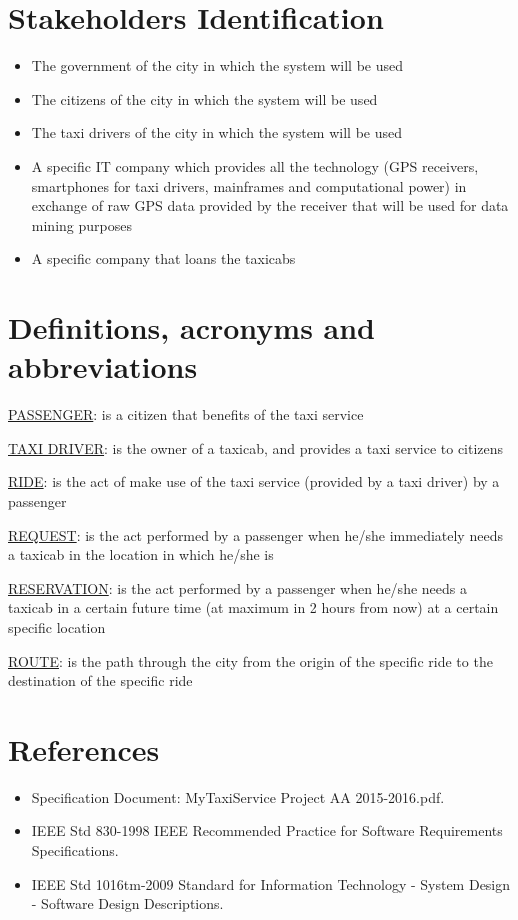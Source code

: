 \section{Stakeholders Identification}
\begin{itemize}
	\item The government of the city in which the system will be used
	\item The citizens of the city in which the system will be used
	\item The taxi drivers of the city in which the system will be used
	\item A specific IT company which provides all the technology (GPS receivers, smartphones for taxi drivers, mainframes and computational power) in exchange of raw GPS data provided by the receiver that will be used for data mining purposes
	\item A specific company that loans the taxicabs
\end{itemize}

\section{Definitions, acronyms and abbreviations}
\begin{description}
	\item \underline{PASSENGER}: is a citizen that benefits of the taxi service
	\item \underline{TAXI DRIVER}: is the owner of a taxicab, and provides a taxi service to citizens
	\item \underline{RIDE}: is the act of make use of the taxi service (provided by a taxi driver) by a passenger
	\item \underline{REQUEST}: is the act performed by a passenger when he/she immediately needs a taxicab in the location in which he/she is 
	\item \underline{RESERVATION}: is the act performed by a passenger when he/she needs a taxicab in a certain future time (at maximum in 2 hours from now) at a certain specific location
	\item \underline{ROUTE}: is the path through the city from the origin of the specific ride to the destination of the specific ride
\end{description}

\section{References}
\begin{itemize}
	\item Specification Document: MyTaxiService Project AA 2015-2016.pdf.
	\item IEEE Std 830-1998 IEEE Recommended Practice for Software Requirements Specifications.
	\item IEEE Std 1016tm-2009 Standard for Information Technology - System Design - Software Design Descriptions.
\end{itemize}

